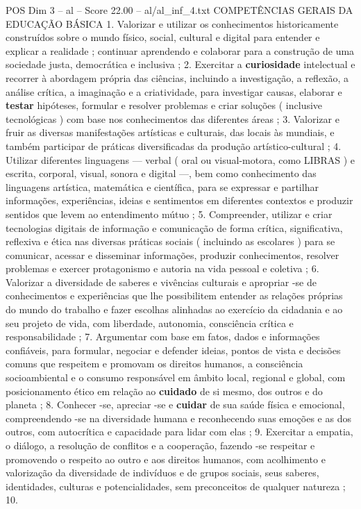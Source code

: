 \begin{textsample}{POS Dim 3 – al – Score 22.00 – al/al\_inf\_4.txt}  \label{ex:f3_pos_213}
COMPETÊNCIAS GERAIS DA EDUCAÇÃO BÁSICA 1.
Valorizar e utilizar os conhecimentos historicamente construídos sobre o mundo físico, social, cultural e digital para entender e explicar a realidade ; continuar aprendendo e colaborar para a construção de uma sociedade justa, democrática e inclusiva ; 2.
Exercitar a \textbf{curiosidade} intelectual e recorrer à abordagem própria das ciências, incluindo a investigação, a reflexão, a análise crítica, a imaginação e a criatividade, para investigar causas, elaborar e \textbf{testar} hipóteses, formular e resolver problemas e criar soluções ( inclusive tecnológicas ) com base nos conhecimentos das diferentes áreas ; 3.
Valorizar e fruir as diversas manifestações artísticas e culturais, das locais às mundiais, e também participar de práticas diversificadas da produção artístico-cultural ; 4.
Utilizar diferentes linguagens — verbal ( oral ou visual-motora, como LIBRAS ) e escrita, corporal, visual, sonora e digital —, bem como conhecimento das linguagens artística, matemática e científica, para se expressar e partilhar informações, experiências, ideias e sentimentos em diferentes contextos e produzir sentidos que levem ao entendimento mútuo ; 5.
Compreender, utilizar e criar tecnologias digitais de informação e comunicação de forma crítica, significativa, reflexiva e ética nas diversas práticas sociais ( incluindo as escolares ) para se comunicar, acessar e disseminar informações, produzir conhecimentos, resolver problemas e exercer protagonismo e autoria na vida pessoal e coletiva ; 6.
Valorizar a diversidade de saberes e vivências culturais e apropriar -se de conhecimentos e experiências que lhe possibilitem entender as relações próprias do mundo do trabalho e fazer escolhas alinhadas ao exercício da cidadania e ao seu projeto de vida, com liberdade, autonomia, consciência crítica e responsabilidade ; 7.
Argumentar com base em fatos, dados e informações confiáveis, para formular, negociar e defender ideias, pontos de vista e decisões comuns que respeitem e promovam os direitos humanos, a consciência socioambiental e o consumo responsável em âmbito local, regional e global, com posicionamento ético em relação ao \textbf{cuidado} de si mesmo, dos outros e do planeta ; 8.
Conhecer -se, apreciar -se e \textbf{cuidar} de sua saúde física e emocional, compreendendo -se na diversidade humana e reconhecendo suas emoções e as dos outros, com autocrítica e capacidade para lidar com elas ; 9.
Exercitar a empatia, o diálogo, a resolução de conflitos e a cooperação, fazendo -se respeitar e promovendo o respeito ao outro e aos direitos humanos, com acolhimento e valorização da diversidade de indivíduos e de grupos sociais, seus saberes, identidades, culturas e potencialidades, sem preconceitos de qualquer natureza ; 10.

\end{textsample}
